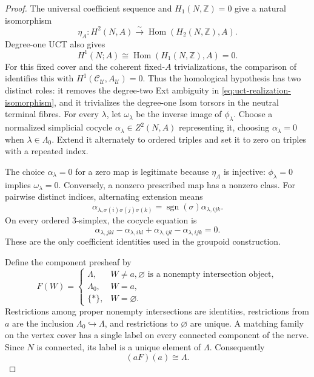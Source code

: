 \begin{proof}
The universal coefficient sequence and \(H_1(N,\mathbb Z)=0\) give a natural
isomorphism
\begin{equation}\label{eq:uct-realization-isomorphism}
 \eta_A:H^2(N,A)\xrightarrow{\sim}
 \operatorname{Hom}(H_2(N,\mathbb Z),A).
\end{equation}
Degree-one UCT also gives
\begin{equation}\label{eq:degree-one-uct-terminal-vanishing}
 H^1(N;A)
 \cong\operatorname{Hom}(H_1(N,\mathbb Z),A)=0.
\end{equation}
For this fixed cover and the coherent fixed-\(A\) trivializations, the
comparison of  identifies this with
\(H^1(\mathcal C_{\mathcal U},A_{\mathcal U})=0\).  Thus the homological
hypothesis has two distinct roles: it removes the degree-two Ext ambiguity
in \eqref{eq:uct-realization-isomorphism}, and it trivializes the
degree-one Isom torsors in the neutral terminal fibres.
For every \(\lambda\), let \(\omega_\lambda\) be the inverse image of
\(\phi_\lambda\).  Choose a normalized simplicial cocycle
\(\alpha_\lambda\in Z^2(N,A)\) representing it, choosing
\(\alpha_\lambda=0\) when \(\lambda\in\Lambda_0\).  Extend it alternately
to ordered triples and set it to zero on triples with a repeated index.

The choice \(\alpha_\lambda=0\) for a zero map is legitimate because
\(\eta_A\) is injective: \(\phi_\lambda=0\) implies
\(\omega_\lambda=0\).  Conversely, a nonzero prescribed map has a nonzero
class.  For pairwise distinct indices, alternating extension means
\[
 \alpha_{\lambda,\sigma(i)\sigma(j)\sigma(k)}
 =\operatorname{sgn}(\sigma)\alpha_{\lambda,ijk}.
\]
On every ordered \(3\)-simplex, the cocycle equation is
\begin{equation}\label{eq:realization-cocycle-equation}
 \alpha_{\lambda,jkl}-\alpha_{\lambda,ikl}
 +\alpha_{\lambda,ijl}-\alpha_{\lambda,ijk}=0.
\end{equation}
These are the only coefficient identities used in the groupoid
construction.

Define the component presheaf by
\[
 F(W)=
 \begin{cases}
 \Lambda,&W\ne a,\varnothing\text{ is a nonempty intersection object},\\
 \Lambda_0,&W=a,\\
 \{*\},&W=\varnothing.
 \end{cases}
\]
Restrictions among proper nonempty intersections are identities,
restrictions from \(a\) are the inclusion
\(\Lambda_0\hookrightarrow\Lambda\), and restrictions to
\(\varnothing\) are unique.  A matching family on the vertex cover has a
single label on every connected component of the nerve.  Since \(N\) is
connected, its label is a unique element of \(\Lambda\).  Consequently
\begin{equation}\label{eq:label-sheafification}
 (aF)(a)\cong\Lambda.
\end{equation}


\end{proof}
